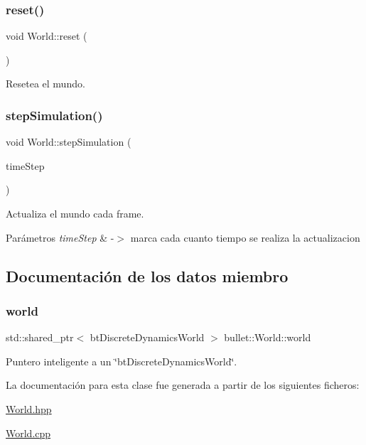 \subsubsection{\texorpdfstring{reset()}{reset()}}
{\footnotesize\ttfamily void World\+::reset (\begin{DoxyParamCaption}{ }\end{DoxyParamCaption})}



Resetea el mundo. 

\mbox{\label{classbullet_1_1_world_af44424b7aa06ece6f466db7b46a2ec62}} 
\subsubsection{\texorpdfstring{stepSimulation()}{stepSimulation()}}
{\footnotesize\ttfamily void World\+::step\+Simulation (\begin{DoxyParamCaption}\item[{bt\+Scalar}]{time\+Step }\end{DoxyParamCaption})}



Actualiza el mundo cada frame. 


\begin{DoxyParams}{Parámetros}
{\em time\+Step} & -\/$>$ marca cada cuanto tiempo se realiza la actualizacion \\
\hline
\end{DoxyParams}


\subsection{Documentación de los datos miembro}
\mbox{\label{classbullet_1_1_world_acae0ff3a821fe6e921f9bcaee6021875}} 
\subsubsection{\texorpdfstring{world}{world}}
{\footnotesize\ttfamily std\+::shared\+\_\+ptr$<$ bt\+Discrete\+Dynamics\+World $>$ bullet\+::\+World\+::world}



Puntero inteligente a un \char`\"{}bt\+Discrete\+Dynamics\+World\char`\"{}. 



La documentación para esta clase fue generada a partir de los siguientes ficheros\+:\begin{DoxyCompactItemize}
\item 
\mbox{\hyperlink{_world_8hpp}{World.\+hpp}}\item 
\mbox{\hyperlink{_world_8cpp}{World.\+cpp}}\end{DoxyCompactItemize}
